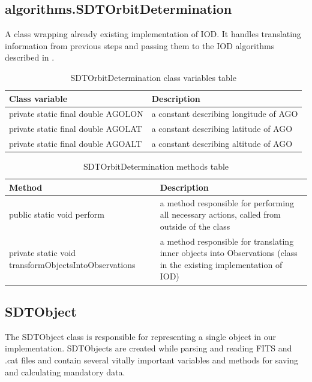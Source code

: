 \subsection{algorithms.SDTOrbitDetermination}

	A class wrapping already existing implementation of IOD. It handles translating information from previous steps and passing them to the IOD algorithms described in .
	
\begin{table}[H]
\centering
\setlength{\extrarowheight}{2pt}
\begin{tabularx}{\textwidth}{|X|X|}
\hline
\textbf{Class variable} & \textbf{Description} \\ \hline
private static final double \mbox{AGOLON} & a constant describing longitude of AGO \\ \hline
private static final double \mbox{AGOLAT} & a constant describing latitude of AGO\\ \hline
private static final double \mbox{AGOALT} & a constant describing altitude of AGO\\ \hline
\end{tabularx}
\caption{SDTOrbitDetermination class variables table}
\label{tab:class_variables_OD}
\end{table}

\begin{table}[H]
\centering
\setlength{\extrarowheight}{2pt}
\begin{tabularx}{\textwidth}{|X|X|}
\hline
\textbf{Method} & \textbf{Description} \\ \hline
public static void \mbox{perform} & a method responsible for performing all necessary actions, called from outside of the class \\ \hline
private static void \mbox{transformObjectsIntoObservations} & a method responsible for translating inner objects into Observations (class in the existing implementation of IOD)\\ \hline
\end{tabularx}
\caption{SDTOrbitDetermination methods table}
\label{tab:class_methods_OD}
\end{table}

\subsection{SDTObject}\label{subsec:object}

	The SDTObject class is responsible for representing a single object in our implementation. SDTObjects are created while parsing and reading FITS and .cat files and contain several vitally important variables and methods for saving and calculating mandatory data.
	
